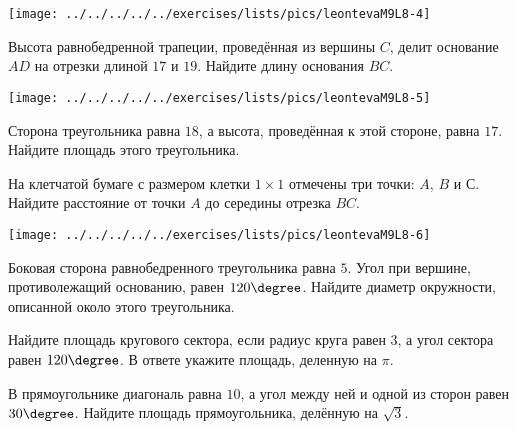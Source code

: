 \begin{class}[number=8]
\begin{listofex}
     	\hspace{0.02\linewidth}
     	\begin{minipage}[t]{\picwidth}
			\texttt{[image: ../../../../../exercises/lists/pics/leontevaM9L8-4]}
     	\end{minipage}
     	\item
     	\begin{minipage}[t]{\bodywidth}
     		 Высота равнобедренной трапеции, проведённая из вершины \( C \), делит основание \( AD \) на отрезки длиной \( 17 \) и \( 19 \). Найдите длину основания \( BC \).
     	\end{minipage}
     	\hspace{0.02\linewidth}
     	\begin{minipage}[t]{\picwidth}
			\texttt{[image: ../../../../../exercises/lists/pics/leontevaM9L8-5]}
     	\end{minipage}
     	\item Сторона треугольника равна \( 18 \), а высота, проведённая к этой стороне, равна \( 17 \). Найдите площадь этого треугольника.
     	\item 
     	\begin{minipage}[t]{\bodywidth}
     		На клетчатой бумаге с размером клетки \( 1\times 1 \) отмечены три точки: \( A \), \( B \) и \( С \). Найдите расстояние от точки \( A \) до середины отрезка \( BC \).
     	\end{minipage}
     	\hspace{0.02\linewidth}
     	\begin{minipage}[t]{\picwidth}
			\texttt{[image: ../../../../../exercises/lists/pics/leontevaM9L8-6]}
     	\end{minipage}
     	\item Боковая сторона равнобедренного треугольника равна \( 5 \). Угол при вершине, противолежащий основанию, равен \( 120\degree \). Найдите диаметр окружности, описанной около этого треугольника.
     	\item Найдите площадь кругового сектора, если радиус круга равен \( 3 \), а угол сектора равен \( 120\degree \). В
     	ответе укажите площадь, деленную на \( \pi \).
     	\item В прямоугольнике диагональ равна \( 10 \), а угол между ней и одной из сторон равен \( 30\degree \). Найдите
     	площадь прямоугольника, делённую на \( \sqrt{3} \).

\end{listofex}
\end{class}
